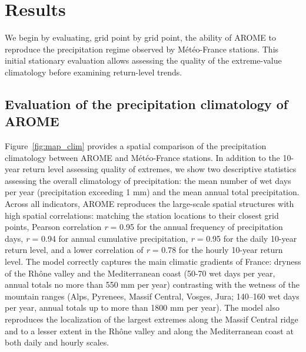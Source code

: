 ﻿\documentclass[hess, manuscript]{copernicus}
\providecommand{\DIFaddend}{} %
\begin{document}
\DIFaddend \section{Results}\label{results}

We begin by evaluating, grid point by grid point, the ability of AROME
to reproduce the precipitation regime observed by Météo-France stations.
This initial stationary evaluation allows assessing the quality of the extreme-value climatology before examining return-level trends.

\subsection{Evaluation of the precipitation climatology of AROME}
\label{evaluation-of-the-precipitation-climatology-by-arome}

Figure~\ref{fig:map_clim} provides a spatial comparison of the precipitation climatology between AROME and Météo-France stations. In addition to the 10-year return level assessing quality of extremes, we show two descriptive statistics assessing the overall climatology of precipitation: the mean number of wet days per year (precipitation exceeding 1 mm) and the mean annual total precipitation. Across all indicators, AROME reproduces the large-scale spatial structures with high spatial correlations: matching the station locations to their closest grid points, Pearson correlation \emph{r} = 0.95 for the annual frequency of precipitation days, \emph{r} = 0.94 for annual cumulative precipitation, \emph{r} = 0.95 for the daily 10-year return level, and a lower correlation of \emph{r} = 0.78 for the hourly 10-year return level. The model correctly captures the main climatic gradients of France: dryness of the Rhône valley and the Mediterranean coast (50-70 wet days per year, annual totals no more than 550 mm per year) contrasting with the wetness of the mountain ranges (Alps, Pyrenees, Massif Central, Vosges, Jura; 140--160 wet days per year, annual totals up to more than 1800 mm per year). The model also reproduces the localization of the largest extremes along the Massif Central ridge and to a lesser extent in the Rhône valley and along the Mediterranean coast at both daily and hourly scales.
\end{document}
